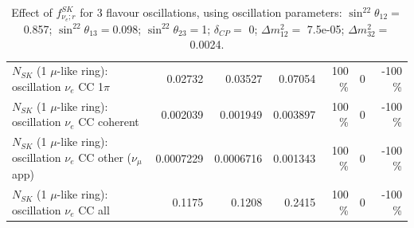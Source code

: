 \begin{table}
\begin{tabular}{| l | r | r | r  r | r  r |}
                     $N_{SK}$ (1 $\mu$-like ring): oscillation $\nu_e$ CC 1$\pi$ &         0.02732 &         0.03527 &         0.07054 &      100 \%  &               0 &     -100 \%  \\ 
                   $N_{SK}$ (1 $\mu$-like ring): oscillation $\nu_e$ CC coherent &        0.002039 &        0.001949 &        0.003897 &      100 \%  &               0 &     -100 \%  \\ 
      $N_{SK}$ (1 $\mu$-like ring): oscillation $\nu_e$ CC other ($\nu_\mu$ app) &       0.0007229 &       0.0006716 &        0.001343 &      100 \%  &               0 &     -100 \%  \\ 
                       $N_{SK}$ (1 $\mu$-like ring): oscillation $\nu_e$  CC all &          0.1175 &          0.1208 &          0.2415 &      100 \%  &               0 &     -100 \%  \\ 
\hline
\hline
\end{tabular}
\caption{ Effect of $f_{\nu_e; r}^{SK}$ for 3 flavour oscillations, using oscillation parameters:  $\sin^22\theta_{12} = $0.857; $\sin^22\theta_{13} = $0.098; $\sin^22\theta_{23} = $1; $\delta_{CP} = $        0; $\Delta m^2_{12} = $    7.5e-05; $\Delta m^2_{32} = $    0.0024. }
\label{tab:num_sk_1Rmu_nuecc_eff_1RmuT_3f_osc_t13:0.098}
\end{table}
\clearpage
